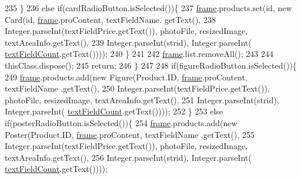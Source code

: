 \begin{DoxyCode}
235                         \}
236                         \textcolor{keywordflow}{else} \textcolor{keywordflow}{if}(cardRadioButton.isSelected())\{
237                             \hyperlink{classpkg_1_1_product_u_i_a49f9ae805cdac34c866e6c1593b6e625}{frame}.products.set(\textcolor{keywordtype}{id}, \textcolor{keyword}{new} Card(\textcolor{keywordtype}{id}, \hyperlink{classpkg_1_1_product_u_i_a49f9ae805cdac34c866e6c1593b6e625}{frame}.proContent, textFieldName.
      getText(),
238                                     Integer.parseInt(textFieldPrice.getText()), photoFile, resizedImage, 
      textAreaInfo.getText(),
239                                     Integer.parseInt(strid), Integer.parseInt(
      \hyperlink{classpkg_1_1_product_u_i_ac35d0e67c152e5bcc6cdf3b9cc79f90b}{textFieldCount}.getText())));
240                         \}
241                         
242                         \hyperlink{classpkg_1_1_product_u_i_a49f9ae805cdac34c866e6c1593b6e625}{frame}.list.removeAll();
243                         
244                         thisClass.dispose();
245                         \textcolor{keywordflow}{return};
246                     \}
247                     
248                     \textcolor{keywordflow}{if}(figureRadioButton.isSelected())\{
249                         \hyperlink{classpkg_1_1_product_u_i_a49f9ae805cdac34c866e6c1593b6e625}{frame}.products.add(\textcolor{keyword}{new} Figure(Product.ID, \hyperlink{classpkg_1_1_product_u_i_a49f9ae805cdac34c866e6c1593b6e625}{frame}.proContent, textFieldName
      .getText(),
250                                 Integer.parseInt(textFieldPrice.getText()), photoFile, resizedImage, 
      textAreaInfo.getText(),
251                                 Integer.parseInt(strid), Integer.parseInt(
      \hyperlink{classpkg_1_1_product_u_i_ac35d0e67c152e5bcc6cdf3b9cc79f90b}{textFieldCount}.getText())));
252                     \}
253                     \textcolor{keywordflow}{else} \textcolor{keywordflow}{if}(posterRadioButton.isSelected())\{
254                         \hyperlink{classpkg_1_1_product_u_i_a49f9ae805cdac34c866e6c1593b6e625}{frame}.products.add(\textcolor{keyword}{new} Poster(Product.ID, \hyperlink{classpkg_1_1_product_u_i_a49f9ae805cdac34c866e6c1593b6e625}{frame}.proContent, textFieldName
      .getText(),
255                                 Integer.parseInt(textFieldPrice.getText()), photoFile, resizedImage, 
      textAreaInfo.getText(),
256                                 Integer.parseInt(strid), Integer.parseInt(
      \hyperlink{classpkg_1_1_product_u_i_ac35d0e67c152e5bcc6cdf3b9cc79f90b}{textFieldCount}.getText())));

\end{DoxyCode}
